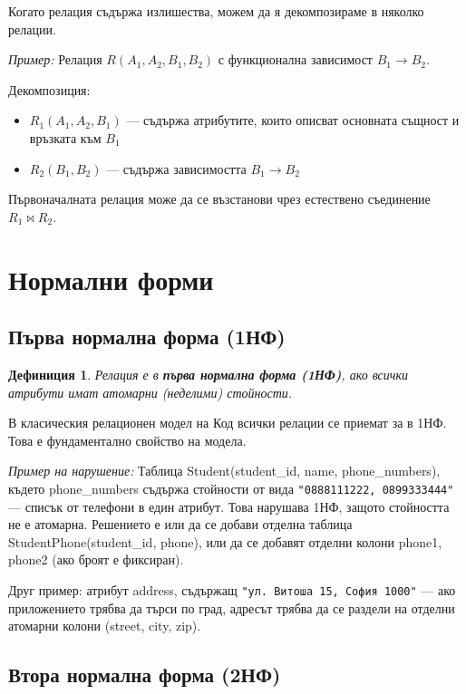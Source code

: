 \documentclass{scrartcl}
\newtheorem{definition}{Дефиниция}
\begin{document}
\begin{FlushLeft}
Когато релация съдържа излишества, можем да я декомпозираме в няколко релации.

\textit{Пример:} Релация $R(A_1, A_2, B_1, B_2)$ с функционална зависимост $B_1 \rightarrow B_2$.

Декомпозиция:
\begin{itemize}
    \item $R_1(A_1, A_2, B_1)$ --- съдържа атрибутите, които описват основната същност и връзката към $B_1$
    \item $R_2(B_1, B_2)$ --- съдържа зависимостта $B_1 \rightarrow B_2$
\end{itemize}

Първоначалната релация може да се възстанови чрез естествено съединение $R_1 \bowtie R_2$.

\section{Нормални форми}

\subsection{Първа нормална форма (1НФ)}

\begin{definition}
Релация е в \textbf{\textit{първа нормална форма (1НФ)}}, ако всички атрибути имат атомарни (неделими) стойности.
\end{definition}

В класическия релационен модел на Код всички релации се приемат за в 1НФ. Това е фундаментално свойство на модела.

\textit{Пример на нарушение:} Таблица Student(student\_id, name, phone\_numbers), където phone\_numbers съдържа стойности от вида \texttt{"0888111222, 0899333444"} --- списък от телефони в един атрибут. Това нарушава 1НФ, защото стойността не е атомарна. Решението е или да се добави отделна таблица StudentPhone(student\_id, phone), или да се добавят отделни колони phone1, phone2 (ако броят е фиксиран).

Друг пример: атрибут address, съдържащ \texttt{"ул. Витоша 15, София 1000"} --- ако приложението трябва да търси по град, адресът трябва да се раздели на отделни атомарни колони (street, city, zip).

\subsection{Втора нормална форма (2НФ)}


\end{FlushLeft}
\end{document}
